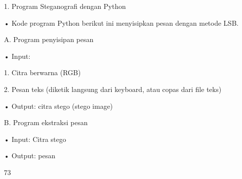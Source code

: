 \documentclass{article}
\begin{document}

1. Program Steganografi dengan Python

• Kode program Python berikut ini menyisipkan pesan dengan metode LSB.

A. Program penyisipan pesan 

• Input: 

   1.  Citra berwarna (RGB)

   2.  Pesan teks (diketik langsung dari keyboard, atau copas dari file teks)

• Output: citra stego (stego image)

B. Program ekstraksi pesan

• Input:  Citra stego

• Output: pesan 

73
\end{document}
